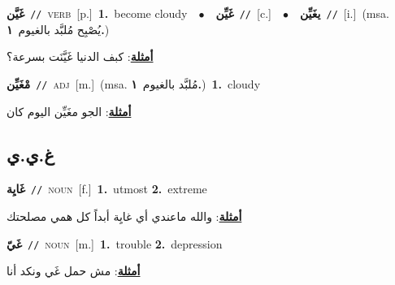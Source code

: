 \documentclass[10pt,a4paper,twoside]{article} %
\begin{document}
\begin{multicols}{2}
{\setlength\topsep{0pt}\textbf{\foreignlanguage{arabic}{غَيَّن}}\ {\color{gray}\texttt{//}\color{black}}\ \textsc{verb}\ [p.]\ \textbf{1.}~become cloudy\ \ $\bullet$\ \ \setlength\topsep{0pt}\textbf{\foreignlanguage{arabic}{غَيِّن}}\ {\color{gray}\texttt{//}\color{black}}\ [c.]\ \ $\bullet$\ \ \setlength\topsep{0pt}\textbf{\foreignlanguage{arabic}{يغَيِّن}}\ {\color{gray}\texttt{//}\color{black}}\ [i.]\ \color{gray}(msa. \foreignlanguage{arabic}{يُصْبِح مُلبَّد بالغيوم}~\foreignlanguage{arabic}{\textbf{١.}})\color{black}\  \begin{flushright}\color{gray}\foreignlanguage{arabic}{\textbf{\underline{\foreignlanguage{arabic}{أمثلة}}}: كبف الدنيا غَيَّنَت بسرعة؟}\end{flushright}\color{black}} \vspace{2mm}

{\setlength\topsep{0pt}\textbf{\foreignlanguage{arabic}{مْغَيِّن}}\ {\color{gray}\texttt{//}\color{black}}\ \textsc{adj}\ [m.]\ \color{gray}(msa. \foreignlanguage{arabic}{مُلبَّد بالغيوم}~\foreignlanguage{arabic}{\textbf{١.}})\color{black}\ \textbf{1.}~cloudy\  \begin{flushright}\color{gray}\foreignlanguage{arabic}{\textbf{\underline{\foreignlanguage{arabic}{أمثلة}}}: الجو مغَيِّن اليوم كان}\end{flushright}\color{black}} \vspace{2mm}

\vspace{-3mm}
\subsection*{\color{blue}\foreignlanguage{arabic}{غ.ي.ي}\color{blue}{}} 

{\setlength\topsep{0pt}\textbf{\foreignlanguage{arabic}{غَايِة}}\ {\color{gray}\texttt{//}\color{black}}\ \textsc{noun}\ [f.]\ \textbf{1.}~utmost  \textbf{2.}~extreme\  \begin{flushright}\color{gray}\foreignlanguage{arabic}{\textbf{\underline{\foreignlanguage{arabic}{أمثلة}}}: والله ماعندي أي غايِة أبداً كل همي مصلحتك}\end{flushright}\color{black}} \vspace{2mm}

{\setlength\topsep{0pt}\textbf{\foreignlanguage{arabic}{غَيّ}}\ {\color{gray}\texttt{//}\color{black}}\ \textsc{noun}\ [m.]\ \textbf{1.}~trouble  \textbf{2.}~depression\  \begin{flushright}\color{gray}\foreignlanguage{arabic}{\textbf{\underline{\foreignlanguage{arabic}{أمثلة}}}: مش حمل غَي ونكد  أنا}\end{flushright}\color{black}} \vspace{2mm}

\end{multicols}
\end{document}
